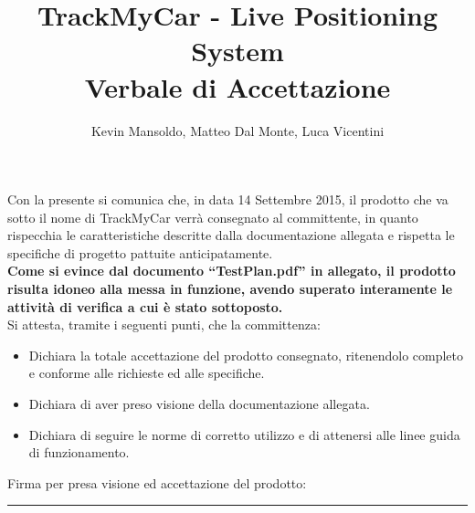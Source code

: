 \documentclass[a4paper,12pt]{article}
\begin{document}
\title{\textbf{TrackMyCar - Live Positioning System} \\ Verbale di Accettazione}

\author{Kevin Mansoldo, Matteo Dal Monte, Luca Vicentini}
\date{}
\maketitle
\pagebreak

Con la presente si comunica che, in data 14 Settembre 2015, il prodotto che va sotto il nome di TrackMyCar verrà consegnato al committente, in quanto rispecchia le caratteristiche descritte dalla documentazione allegata e rispetta le specifiche di progetto pattuite anticipatamente. \\


\textbf{Come si evince dal documento ``TestPlan.pdf'' in allegato, il prodotto risulta idoneo alla messa in funzione, avendo superato interamente le attività di verifica a cui è stato sottoposto.} \\

Si attesta, tramite i seguenti punti, che la committenza:
\begin{itemize}
\item Dichiara la totale accettazione del prodotto consegnato, ritenendolo completo e conforme alle richieste ed alle specifiche.
\item Dichiara di aver preso visione della documentazione allegata.
\item Dichiara di seguire le norme di corretto utilizzo e di attenersi alle linee guida di funzionamento.
\end{itemize}

\vspace{5cm}
Firma per presa visione ed accettazione del prodotto:

\vspace{1cm}
\rule{9.5cm}{0.4pt}
\end{document}
